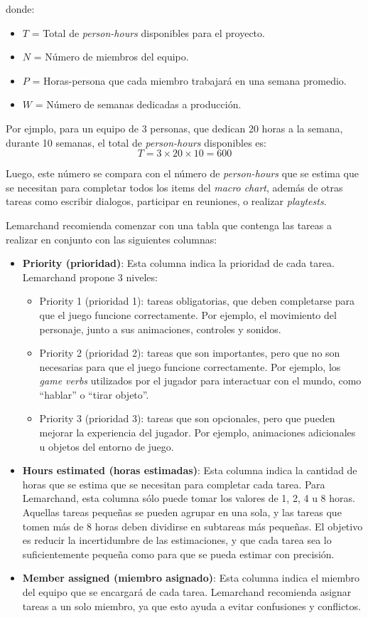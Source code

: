 donde:
\begin{itemize}
    \item $T$ = Total de \textit{person-hours} disponibles para el proyecto.
    \item $N$ = Número de miembros del equipo.
    \item $P$ = Horas-persona que cada miembro trabajará en una semana promedio.
    \item $W$ = Número de semanas dedicadas a producción.
\end{itemize}
\par Por ejmplo, para un equipo de 3 personas, que dedican 20 horas a la semana, durante 10 semanas, el total de \textit{person-hours} disponibles es:
\begin{equation}
    T = 3 \times 20 \times 10 = 600
\end{equation}
\par Luego, este número se compara con el número de \textit{person-hours} que se estima que se necesitan para completar todos los items del \textit{macro chart}, además de otras tareas como escribir dialogos, participar en reuniones, o realizar \textit{playtests}.
\par Lemarchand recomienda comenzar con una tabla que contenga las tareas a realizar en conjunto con las siguientes columnas:
\begin{itemize}
    \item \textbf{Priority (prioridad)}: Esta columna indica la prioridad de cada tarea. Lemarchand propone 3 niveles:
    \begin{itemize}
        \item Priority 1 (prioridad 1): tareas obligatorias, que deben completarse para que el juego funcione correctamente. Por ejemplo, el movimiento del personaje, junto a sus animaciones, controles y sonidos.
        \item Priority 2 (prioridad 2): tareas que son importantes, pero que no son necesarias para que el juego funcione correctamente. Por ejemplo, los \textit{game verbs} utilizados por el jugador para interactuar con el mundo, como ``hablar'' o ``tirar objeto''.
        \item Priority 3 (prioridad 3): tareas que son opcionales, pero que pueden mejorar la experiencia del jugador. Por ejemplo, animaciones adicionales u objetos del entorno de juego.  
    \end{itemize}
    \item \textbf{Hours estimated (horas estimadas)}: Esta columna indica la cantidad de horas que se estima que se necesitan para completar cada tarea. Para Lemarchand, esta columna sólo puede tomar los valores de 1, 2, 4 u 8 horas. Aquellas tareas pequeñas se pueden agrupar en una sola, y las tareas que tomen más de 8 horas deben dividirse en subtareas más pequeñas. El objetivo es reducir la incertidumbre de las estimaciones, y que cada tarea sea lo suficientemente pequeña como para que se pueda estimar con precisión. 
    \item \textbf{Member assigned (miembro asignado)}: Esta columna indica el miembro del equipo que se encargará de cada tarea. Lemarchand recomienda asignar tareas a un solo miembro, ya que esto ayuda a evitar confusiones y conflictos.
\end{itemize} 
